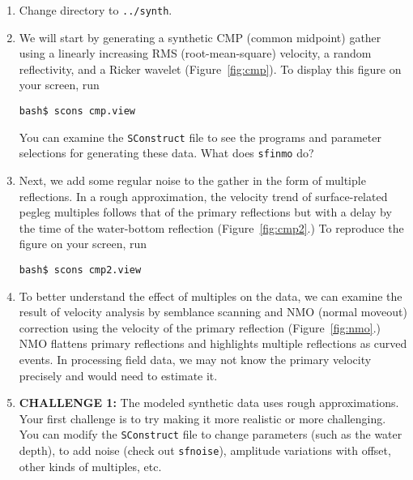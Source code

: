 


\begin{enumerate}

\item Change directory to \texttt{../synth}.

\item We will start by generating a synthetic CMP (common midpoint) gather using a linearly increasing RMS (root-mean-square) velocity,  a random reflectivity, and a Ricker wavelet (Figure~\ref{fig:cmp}). To display this figure on your screen, run
\begin{verbatim}
bash$ scons cmp.view
\end{verbatim}
You can examine the \texttt{SConstruct} file to see the programs and parameter selections for generating these data. What does \texttt{sfinmo} do?

\item Next, we add some regular noise to the gather in the form of multiple reflections. In a rough approximation, the velocity trend of surface-related pegleg multiples follows that of the primary reflections but with a delay by the time of the water-bottom reflection (Figure~\ref{fig:cmp2}.) To reproduce the figure on your screen, run
\begin{verbatim}
bash$ scons cmp2.view
\end{verbatim}

\item To better understand the effect of multiples on the data, we can examine the result of velocity analysis by semblance scanning and NMO (normal moveout) correction using the velocity of the primary reflection (Figure~\ref{fig:nmo}.) NMO flattens primary reflections and highlights multiple reflections as curved events. In processing field data, we may not know the primary velocity precisely and would need to estimate it. 

\item \textbf{CHALLENGE 1:} The modeled synthetic data uses rough approximations. Your first challenge is to try making it more realistic or more challenging. You can modify the \texttt{SConstruct} file to change parameters (such as the water depth), to add noise (check out \texttt{sfnoise}), amplitude variations with offset, other kinds of multiples, etc.

\end{enumerate}

